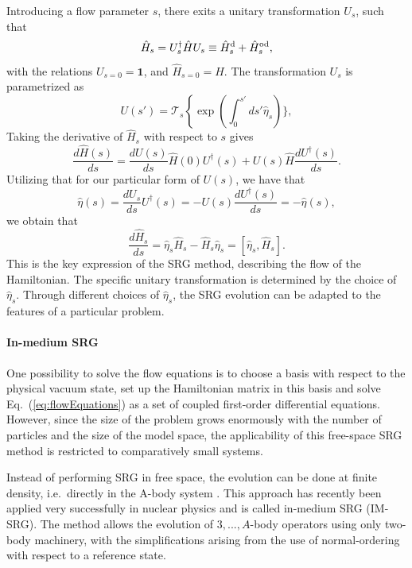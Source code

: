 \documentclass[amsmath, amssymb, aps, floatfix, nofootinbib, preprintnumbers,showpacs, superscriptaddress, twocolumn]{revtex4-1}
\newcommand{\Hd}{\hat{H}^{\rm d}}
\newcommand{\Ho}{\hat{H}^{\rm od}}
\newcommand{\be}{\begin{equation}}
\newcommand{\ee}{\end{equation}}
\begin{document}
 Introducing a flow parameter $s$, there exits a unitary
 transformation $U_s$, such that
\begin{equation}
 \hat{H}_s = U_s^\dagger \hat{H} U_s \equiv \Hd_s + \Ho_s,
\end{equation}
with the relations $U_{s=0} = \mathbf{1}$, and $\hat{H}_{s= 0} =
\hat{H}$.  The transformation $U_s$ is parametrized as
\[
U(s') = \mathcal T_s \left\{ \exp \left(\int_0^{s'} \! ds'\hat{\eta}_s \right)\},
\]
Taking the derivative of $\hat{H}_s$ with respect to $s$ gives
\begin{equation}
 \frac{d \hat H(s)}{d s} = \frac{d U(s)}{ds} \hat{H}(0) U^\dagger(s) + U(s)
 \hat{H} \frac{d U^\dagger(s)}{ds}.
\label{eq:flow_long}
\end{equation}
Utilizing that for our particular form of $U(s)$, we have that \be
\hat{\eta}(s) = \frac{d U_s}{ds} U^\dagger(s) = - U(s) \frac{d U^\dagger(s)}{ds} = -\hat{\eta}(s),
\label{eq:eta}
\ee we obtain that \be \frac{d \hat{H}_s}{ds} = \hat{\eta}_s \hat{H}_s
- \hat{H}_s \hat{\eta}_s = \left[\hat{\eta}_s, \hat{H}_s \right].
\label{eq:flowEquations}
\ee This is the key expression of the SRG method, describing the flow
of the Hamiltonian.  The specific unitary transformation is determined
by the choice of $\hat{\eta}_s$.  Through different choices of
$\hat{\eta}_s$, the SRG evolution can be adapted to the features of a
particular problem.\\

\paragraph*{In-medium SRG}

One possibility to solve the flow equations is to choose a basis with
respect to the physical vacuum state, set up the Hamiltonian matrix in
this basis and solve Eq.~(\ref{eq:flowEquations}) as a set of coupled
first-order differential equations. However, since the size of the
problem grows enormously with the number of particles and the size of
the model space, the applicability of this free-space SRG method is
restricted to comparatively small systems.

Instead of performing SRG in free space, the evolution can be done at
finite density, i.e.~directly in the A-body system
\cite{kehrein2006flow}. This approach has recently been applied very
successfully in nuclear physics \cite{IMSRG,PhysRevLett.106.222502}
and is called in-medium SRG (IM-SRG). The method allows the evolution
of $3,...,A$-body operators using only two-body machinery, with the
simplifications arising from the use of normal-ordering with respect
to a reference state.
\end{document}
